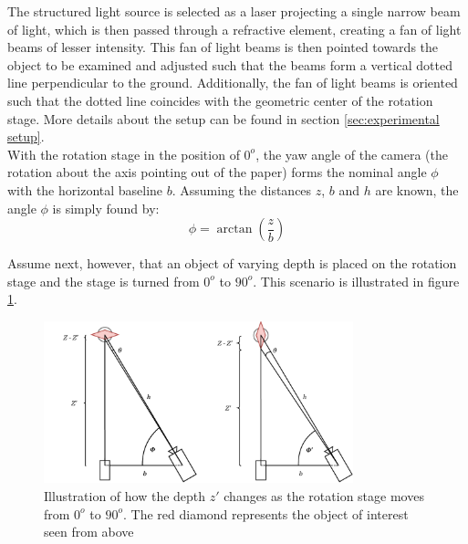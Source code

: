 The structured light source is selected as a laser projecting a single narrow beam of light, which is then passed through a refractive element, creating a fan of light beams of lesser intensity. This fan of light beams is then pointed towards the object to be examined and adjusted such that the beams form a vertical dotted line perpendicular to the ground. Additionally, the fan of light beams is oriented such that the dotted line coincides with the geometric center of the rotation stage. More details about the setup can be found in section \ref{sec:experimental setup}.\\

With the rotation stage in the position of $0^{o}$, the yaw angle of the camera (the rotation about the axis pointing out of the paper) forms the nominal angle $\phi$ with the horizontal baseline $b$. Assuming the distances $z$, $b$ and $h$ are known, the angle $\phi$ is simply found by:
\begin{equation}
\label{eq:phi}
    \phi = \arctan{\left(\frac{z}{b}\right)}
\end{equation}

Assume next, however, that an object of varying depth is placed on the rotation stage and the stage is turned from $0^{o}$ to $90^{o}$. This scenario is illustrated in figure \ref{fig:depth_1}.  

\begin{figure}[h]
    \centering
    \includegraphics[width=0.8\textwidth]{figures/reconstruction/depthchange_v2.pdf}
    \caption{Illustration of how the depth $z'$ changes as the rotation stage moves from $0^{o}$ to $90^{o}$. The red diamond represents the object of interest seen from above}
    \label{fig:depth_1}
\end{figure}

